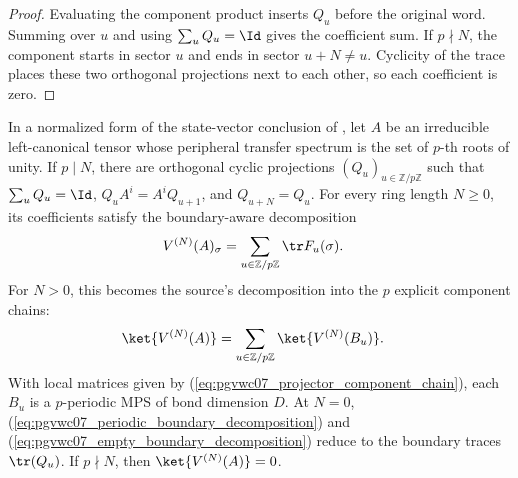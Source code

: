 \begin{proof}
    \leanok
    Evaluating the component product inserts $Q_u$ before the original
    word. Summing over $u$ and using $\sum_uQ_u=\Id$ gives the coefficient
    sum. If $p\nmid N$, the component starts in sector $u$ and ends in
    sector $u+N\ne u$. Cyclicity of the trace places these two orthogonal
    projections next to each other, so each coefficient is zero.
\end{proof}

\begin{theorem}
    \label{thm:pgvwc07_normalized_periodic_state_vector_decomposition}
    \leanok
    In a normalized form of the state-vector conclusion of
    \cite[Theorem~5]{PerezGarcia2007Matrix}, let $A$ be an irreducible
    left-canonical tensor whose peripheral transfer spectrum is the set of
    $p$-th roots of unity. If $p\mid N$, there are orthogonal cyclic
    projections $(Q_u)_{u\in\mathbb Z/p\mathbb Z}$ such that
    $\sum_uQ_u=\Id$, $Q_uA^i=A^iQ_{u+1}$, and $Q_{u+N}=Q_u$. For every
    ring length $N\geq0$, its coefficients satisfy the boundary-aware
    decomposition
    \begin{align}
        V^{(N)}(A)_\sigma
         & =\sum_{u\in\mathbb Z/p\mathbb Z}\tr F_u(\sigma).
        \label{eq:pgvwc07_periodic_boundary_decomposition}
    \end{align}
    For $N>0$, this becomes the source's decomposition into the $p$ explicit
    component chains:
    \begin{align}
        \ket{V^{(N)}(A)}
         & =\sum_{u\in\mathbb Z/p\mathbb Z}\ket{V^{(N)}(B_u)}.
        \label{eq:pgvwc07_periodic_state_vector_decomposition}
    \end{align}
    With local matrices given by (\ref{eq:pgvwc07_projector_component_chain}),
    each $B_u$ is a $p$-periodic MPS of bond dimension $D$. At $N=0$,
    (\ref{eq:pgvwc07_periodic_boundary_decomposition}) and
    (\ref{eq:pgvwc07_empty_boundary_decomposition}) reduce to the boundary
    traces $\tr(Q_u)$. If
    $p\nmid N$, then $\ket{V^{(N)}(A)}=0$.
\end{theorem}

